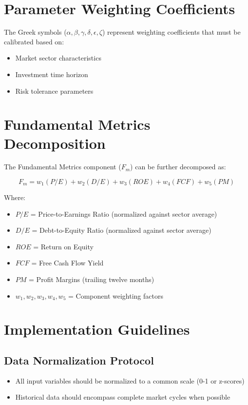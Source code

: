 \documentclass[12pt,a4paper]{article}
\begin{document}
\section{Parameter Weighting Coefficients}
The Greek symbols ($\alpha, \beta, \gamma, \delta, \epsilon, \zeta$) represent weighting coefficients that must be calibrated based on:
\begin{itemize}
    \item Market sector characteristics
    \item Investment time horizon
    \item Risk tolerance parameters
\end{itemize}

\section{Fundamental Metrics Decomposition}
The Fundamental Metrics component ($F_m$) can be further decomposed as:

\begin{equation}
F_m = w_1(P/E) + w_2(D/E) + w_3(ROE) + w_4(FCF) + w_5(PM)
\end{equation}

Where:
\begin{itemize}
    \item $P/E$ = Price-to-Earnings Ratio (normalized against sector average)
    \item $D/E$ = Debt-to-Equity Ratio (normalized against sector average)
    \item $ROE$ = Return on Equity
    \item $FCF$ = Free Cash Flow Yield
    \item $PM$ = Profit Margins (trailing twelve months)
    \item $w_1, w_2, w_3, w_4, w_5$ = Component weighting factors
\end{itemize}

\section{Implementation Guidelines}

\subsection{Data Normalization Protocol}
\begin{itemize}
    \item All input variables should be normalized to a common scale (0-1 or z-scores)
    \item Historical data should encompass complete market cycles when possible
\end{itemize}
\end{document}
